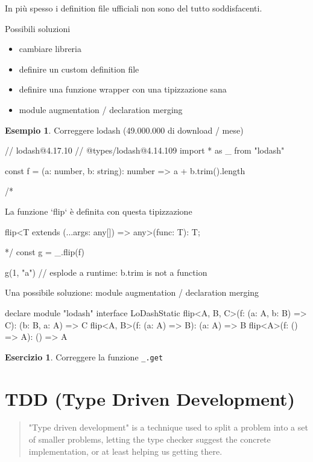\documentclass[12pt]{article}
\theoremstyle{definition}
\newtheorem{example}{Esempio}[subsection]
\newtheorem{exercise}{Esercizio}[subsection]
\newenvironment{code}
  {\vspace{0.5cm} \VerbatimEnvironment\begin{typescriptcode}}
  {\end{typescriptcode} \vspace{0.2cm}}
\begin{document}
In più spesso i definition file ufficiali non sono del tutto soddisfacenti.

Possibili soluzioni

\begin{itemize}
\item cambiare libreria
\item definire un custom definition file
\item definire una funzione wrapper con una tipizzazione sana
\item module augmentation / declaration merging
\end{itemize}

\begin{example}
Correggere lodash (49.000.000 di download / mese)

\begin{code}
// lodash@4.17.10
// @types/lodash@4.14.109
import * as _ from "lodash"

const f = (a: number, b: string): number =>
  a + b.trim().length

/*

  La funzione `flip` è definita con questa tipizzazione

  flip<T extends (...args: any[]) => any>(func: T): T;

*/
const g = _.flip(f)

g(1, "a") // esplode a runtime: b.trim is not a function
\end{code}

Una possibile soluzione: module augmentation / declaration merging

\begin{code}
declare module "lodash" {
  interface LoDashStatic {
    flip<A, B, C>(f: (a: A, b: B) => C): (b: B, a: A) => C
    flip<A, B>(f: (a: A) => B): (a: A) => B
    flip<A>(f: () => A): () => A
  }
}
\end{code}

\end{example}

\begin{exercise}
Correggere la funzione \texttt{\_.get}
\end{exercise}

\newpage
\section{TDD (Type Driven Development)}

\begin{quote}
"Type driven development" is a technique used to split a problem into a set of smaller problems,
letting the type checker suggest the concrete implementation, or at least helping us getting there.
\end{quote}
\end{document}
